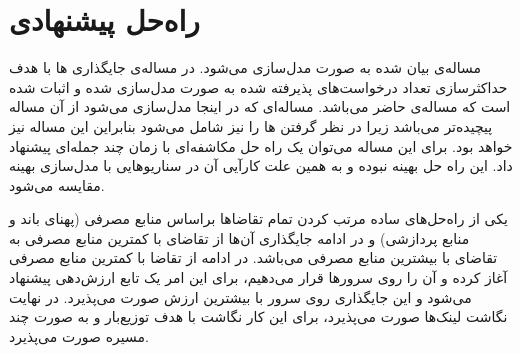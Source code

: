 \chapter{راه‌حل پیشنهادی}

مساله‌ی بیان شده به صورت 
مدل‌سازی می‌شود.
در \cite{Eramo2016}
مساله‌ی جایگذاری ها با هدف حداکثرسازی تعداد درخواست‌های پذیرفته شده
به صورت  مدل‌سازی شده و اثبات شده است که مساله‌ی حاضر  می‌باشد.
مساله‌ای که در اینجا مدل‌سازی می‌شود از آن مساله پیچیده‌تر می‌باشد زیرا در نظر گرفتن ها را نیز شامل می‌شود
بنابراین این مساله نیز  خواهد بود.
برای این مساله می‌توان
یک راه حل مکاشفه‌ای با زمان چند جمله‌ای
پیشنهاد داد. این راه حل بهینه نبوده و به همین علت کارآیی آن
در سناریوهایی با مدل‌سازی بهینه مقایسه می‌شود.

یکی از راه‌حل‌های ساده مرتب کردن تمام تقاضاها براساس منابع مصرفی (پهنای باند و منابع پردازشی)
و در ادامه جایگذاری آن‌ها از تقاضای با کمترین منابع مصرفی به تقاضای با بیشترین منابع مصرفی می‌باشد.
در ادامه از تقاضا با کمترین منابع مصرفی آغاز کرده و آن را روی سرورها قرار می‌دهیم، برای این امر یک تابع ارزش‌دهی پیشنهاد می‌شود
و این جایگذاری روی سرور با بیشترین ارزش صورت می‌پذیرد.
در نهایت نگاشت لینک‌ها صورت می‌پذیرد، برای این کار نگاشت با هدف توزیع‌بار و به صورت چند مسیره صورت می‌پذیرد.